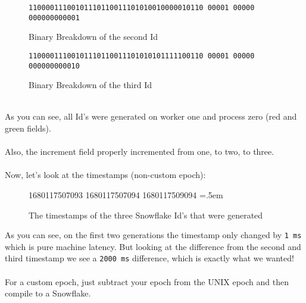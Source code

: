 \documentclass{article}
\newcommand{\code}[1]{\colorbox{cverbbg}{\texttt{#1}}}
\newcommand{\hn}[0]{\hfill \\}
\newenvironment{lcverbatim}
{\SaveVerbatim{cverb}}
{\endSaveVerbatim{}
	\flushleft\fboxrule=0pt\fboxsep=.5em
	\colorbox{cverbbg}{%

		\makebox[\dimexpr\linewidth-2\fboxsep][l]{\BUseVerbatim{cverb}}%
	}
	\endflushleft{}
}
\begin{document}
\begin{figure}[H]
	\large{\texttt{\color{cyan}11000011100101110110011101010010000010110
			\color{red}00001 \color{green}00000
			\color{gray}000000000001}}
	\\
	\caption{Binary Breakdown of the second Id}\label{fig:breakdown_2}
\end{figure}

\begin{figure}[H]
	\large{\texttt{\color{cyan}11000011100101110110011101010101111100110
			\color{red}00001 \color{green}00000
			\color{gray}000000000010}}
	\\
	\caption{Binary Breakdown of the third Id}\label{fig:breakdown_3}
\end{figure}

\hn{}
As you can see, all Id's were generated on worker one and process zero (red and
green fields). \\
\hn{}
Also, the increment field properly incremented from one, to two, to three.
\\
\hn{}
Now, let's look at the timestamps (non-custom epoch):

\begin{figure}[H]
	\begin{lcverbatim}
	1680117507093
	1680117507094
	1680117509094
	\end{lcverbatim}
	\caption{The timestamps of the three Snowflake Id's that were
		generated}\label{fig:breakdown_timestamps}
\end{figure}
As you can see, on the first two generations the timestamp only changed by
\code{1 ms} which is pure machine latency.
But looking at the difference from the second and third timestamp we see a
\code{2000 ms} difference, which is exactly what we wanted! \\
\hn{}
For a custom epoch, just subtract your epoch from the UNIX epoch and then
compile to a Snowflake.

\break{}
\end{document}
